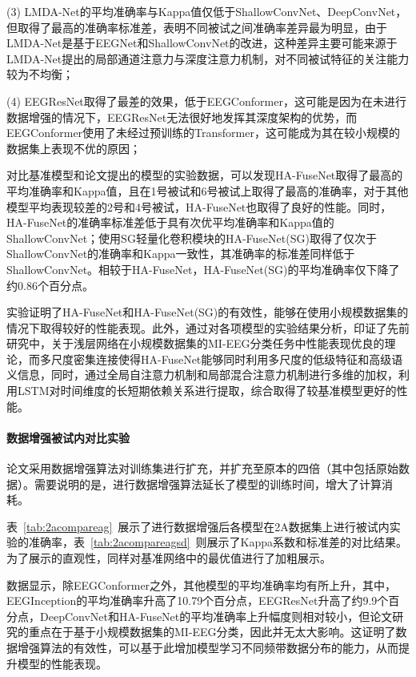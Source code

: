 (3) LMDA-Net的平均准确率与Kappa值仅低于ShallowConvNet、DeepConvNet，但取得了最高的准确率标准差，表明不同被试之间准确率差异最为明显，由于LMDA-Net是基于EEGNet和ShallowConvNet的改进，这种差异主要可能来源于LMDA-Net提出的局部通道注意力与深度注意力机制，对不同被试特征的关注能力较为不均衡；

(4) EEGResNet取得了最差的效果，低于EEGConformer，这可能是因为在未进行数据增强的情况下，EEGResNet无法很好地发挥其深度架构的优势，而EEGConformer使用了未经过预训练的Transformer，这可能成为其在较小规模的数据集上表现不优的原因；

对比基准模型和论文提出的模型的实验数据，可以发现HA-FuseNet取得了最高的平均准确率和Kappa值，且在1号被试和6号被试上取得了最高的准确率，对于其他模型平均表现较差的2号和4号被试，HA-FuseNet也取得了良好的性能。同时，HA-FuseNet的准确率标准差低于具有次优平均准确率和Kappa值的ShallowConvNet；使用SG轻量化卷积模块的HA-FuseNet(SG)取得了仅次于ShallowConvNet的准确率和Kappa一致性，其准确率的标准差同样低于ShallowConvNet。相较于HA-FuseNet，HA-FuseNet(SG)的平均准确率仅下降了约0.86个百分点。

实验证明了HA-FuseNet和HA-FuseNet(SG)的有效性，能够在使用小规模数据集的情况下取得较好的性能表现。此外，通过对各项模型的实验结果分析，印证了先前研究中，关于浅层网络在小规模数据集的MI-EEG分类任务中性能表现优良的理论，而多尺度密集连接使得HA-FuseNet能够同时利用多尺度的低级特征和高级语义信息，同时，通过全局自注意力机制和局部混合注意力机制进行多维的加权，利用LSTM对时间维度的长短期依赖关系进行提取，综合取得了较基准模型更好的性能。

\paragraph{数据增强被试内对比实验}

论文采用数据增强算法对训练集进行扩充，并扩充至原本的四倍（其中包括原始数据）。需要说明的是，进行数据增强算法延长了模型的训练时间，增大了计算消耗。

表~\ref{tab:2acompareag}~展示了进行数据增强后各模型在2A数据集上进行被试内实验的准确率，表~\ref{tab:2acompareagsd}~则展示了Kappa系数和标准差的对比结果。为了展示的直观性，同样对基准网络中的最优值进行了加粗展示。

数据显示，除EEGConformer之外，其他模型的平均准确率均有所上升，其中，EEGInception的平均准确率升高了10.79个百分点，EEGResNet升高了约9.9个百分点，DeepConvNet和HA-FuseNet的平均准确率上升幅度则相对较小，但论文研究的重点在于基于小规模数据集的MI-EEG分类，因此并无太大影响。这证明了数据增强算法的有效性，可以基于此增加模型学习不同频带数据分布的能力，从而提升模型的性能表现。

